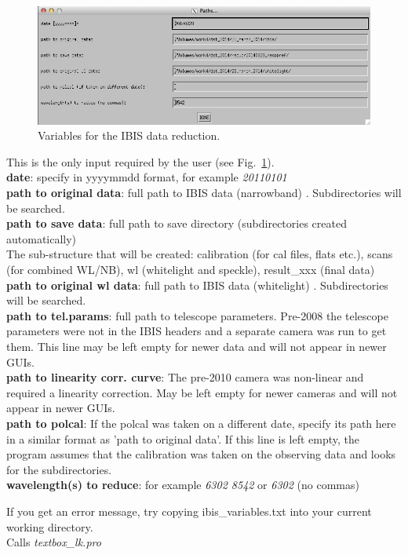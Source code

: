\documentclass[a4paper,12pt]{article}
\begin{document}
\begin{figure}[htb]
\includegraphics[width=\textwidth]{ibis1.png}
\caption{Variables for the IBIS data reduction.\label{figvar}}
\end{figure}

This is the only input required by the user (see Fig.~\ref{figvar}).\\
\textbf{date}: specify in yyyymmdd format, for example \textit{20110101} \\
\textbf{path to original data}: full path to IBIS data (narrowband) . Subdirectories will be searched.\\
\textbf{path to save data}: full path to save directory (subdirectories created automatically) \\
 The sub-structure that will be created: calibration (for cal files, flats etc.), scans (for combined WL/NB), wl (whitelight and speckle), result\_xxx (final data)\\
\textbf{path to original wl data}: full path to IBIS data (whitelight) . Subdirectories will be searched.\\
\textbf{path to tel.params}: full path to telescope parameters. Pre-2008 the telescope parameters were not in the IBIS headers and a separate camera was run to get them. This line may be left empty for newer data and will not appear in newer GUIs.\\
\textbf{path to linearity corr. curve}: The pre-2010 camera was non-linear and required a linearity correction. May be left empty for newer cameras and will not appear in newer GUIs.\\
\textbf{path to polcal}: If the polcal was taken on a different date, specify its path here in a similar format as 'path to original data'. If this line is left empty, the program assumes that the calibration was taken on the observing data and looks for the subdirectories.\\
\textbf{wavelength(s) to reduce}: for example \textit{6302 8542} or \textit{6302} (no commas)

If you get an error message, try copying ibis\_variables.txt into your current working directory.\\
Calls \textit{textbox\_lk.pro}
\end{document}
